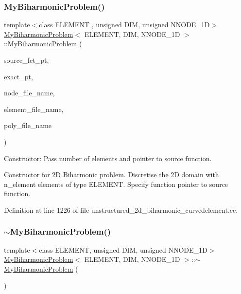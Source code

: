 \subsubsection{\texorpdfstring{My\+Biharmonic\+Problem()}{MyBiharmonicProblem()}}
{\footnotesize\ttfamily template$<$class E\+L\+E\+M\+E\+NT , unsigned D\+IM, unsigned N\+N\+O\+D\+E\+\_\+1D$>$ \\
\hyperlink{classMyBiharmonicProblem}{My\+Biharmonic\+Problem}$<$ E\+L\+E\+M\+E\+NT, D\+IM, N\+N\+O\+D\+E\+\_\+1D $>$\+::\hyperlink{classMyBiharmonicProblem}{My\+Biharmonic\+Problem} (\begin{DoxyParamCaption}\item[{typename \hyperlink{classoomph_1_1MyBiharmonicEquations}{My\+Biharmonic\+Equations}$<$ D\+IM, N\+N\+O\+D\+E\+\_\+1D $>$\+::Source\+Fct\+Pt}]{source\+\_\+fct\+\_\+pt,  }\item[{typename \hyperlink{classoomph_1_1MyBiharmonicEquations}{My\+Biharmonic\+Equations}$<$ D\+IM, N\+N\+O\+D\+E\+\_\+1D $>$\+::Exact\+Soln\+Pt}]{exact\+\_\+pt,  }\item[{const string \&}]{node\+\_\+file\+\_\+name,  }\item[{const string \&}]{element\+\_\+file\+\_\+name,  }\item[{const string \&}]{poly\+\_\+file\+\_\+name }\end{DoxyParamCaption})}



Constructor\+: Pass number of elements and pointer to source function. 

Constructor for 2D Biharmonic problem. Discretise the 2D domain with n\+\_\+element elements of type E\+L\+E\+M\+E\+NT. Specify function pointer to source function. 

Definition at line 1226 of file unstructured\+\_\+2d\+\_\+biharmonic\+\_\+curvedelement.\+cc.

\mbox{\label{classMyBiharmonicProblem_ad6d1bdce803ec5fd13bf6b0e3b1f3ca9}} 
\subsubsection{\texorpdfstring{$\sim$\+My\+Biharmonic\+Problem()}{~MyBiharmonicProblem()}}
{\footnotesize\ttfamily template$<$class E\+L\+E\+M\+E\+NT, unsigned D\+IM, unsigned N\+N\+O\+D\+E\+\_\+1D$>$ \\
\hyperlink{classMyBiharmonicProblem}{My\+Biharmonic\+Problem}$<$ E\+L\+E\+M\+E\+NT, D\+IM, N\+N\+O\+D\+E\+\_\+1D $>$\+::$\sim$\hyperlink{classMyBiharmonicProblem}{My\+Biharmonic\+Problem} (\begin{DoxyParamCaption}{ }\end{DoxyParamCaption})\hspace{0.3cm}{\ttfamily [inline]}}




